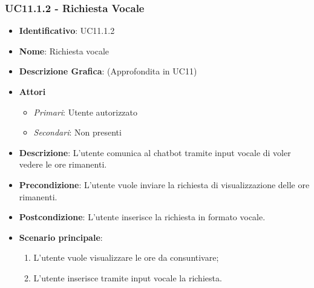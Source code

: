 \subsubsection{UC11.1.2 - Richiesta Vocale}
\begin{itemize}
	\item \textbf{Identificativo}: UC11.1.2
	\item \textbf{Nome}: Richiesta vocale
	\item \textbf{Descrizione Grafica}: (Approfondita in UC11)
	\item \textbf{Attori}
	\begin{itemize} 
		\item \textit{Primari}: Utente autorizzato
		\item \textit{Secondari}: Non presenti
	\end{itemize}
	\item \textbf{Descrizione}: L'utente comunica al chatbot tramite input vocale di voler vedere le ore rimanenti.
	\item \textbf{Precondizione}: L'utente vuole inviare la richiesta di visualizzazione delle ore rimanenti.
	\item \textbf{Postcondizione}: L'utente inserisce la richiesta in formato vocale.
	\item \textbf{Scenario principale}:
	\begin{enumerate}
		\item L'utente vuole visualizzare le ore da consuntivare;
		\item L'utente inserisce tramite input vocale la richiesta.
	\end{enumerate}
\end{itemize}

